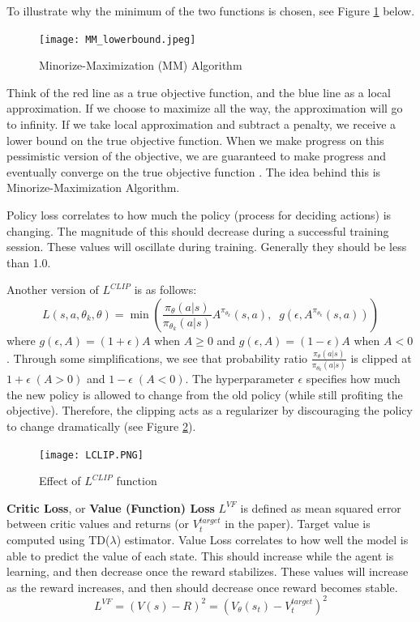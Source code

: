 \documentclass[lang=en,mode=normal,device=normal,color=blue,12pt]{elegantnote}
\DeclareMathOperator*{\1}{\mathbbm{1}}
\begin{document}
To illustrate why the minimum of the two functions is chosen, see Figure \ref{fig:mm_algo} below.
\begin{figure}[!ht]
  \centering
  \texttt{[image: MM\_lowerbound.jpeg]}
  \caption{Minorize-Maximization (MM) Algorithm}
  \label{fig:mm_algo}
\end{figure}
Think of the red line as a true objective function, and the blue line as a local approximation.
If we choose to maximize all the way, the approximation will go to infinity.
If we take local approximation and subtract a penalty, we receive a lower bound on the true objective function.
When we make progress on this pessimistic version of the objective, we are guaranteed to make progress and eventually converge on the true objective function \cite{ppocs294}. The idea behind this is Minorize-Maximization Algorithm.

Policy loss correlates to how much the policy (process for deciding actions) is changing.
The magnitude of this should decrease during a successful training session.
These values will oscillate during training. Generally they should be less than 1.0.


Another version of $L^{CLIP}$ is as follows:
$$ L(s,a,\theta_k,\theta) = \min\left(
\frac{\pi_{\theta}(a|s)}{\pi_{\theta_k}(a|s)}  A^{\pi_{\theta_k}}(s,a), \;\;
g(\epsilon, A^{\pi_{\theta_k}}(s,a))
\right) $$
where $g(\epsilon,A) = (1+\epsilon)A$ when $A \geq 0$ and $g(\epsilon,A) = (1-\epsilon)A$ when $A < 0$. Through some simplifications, we see that probability ratio $\frac{\pi_{\theta}(a|s)}{\pi_{\theta_k}(a|s)}$ is clipped at $1+\epsilon\;(A>0)$ and $1-\epsilon\;(A<0)$. The hyperparameter $\epsilon$ specifies how much the new policy is allowed to change from the old policy (while still profiting the objective). Therefore, the clipping acts as a regularizer by discouraging the policy to change dramatically (see Figure \ref{fig:lclip}).

\begin{figure}[!ht]
  \centering
  \texttt{[image: LCLIP.PNG]}
  \caption{Effect of $L^{CLIP}$ function \cite{ppolclip}}
  \label{fig:lclip}
\end{figure}

\textbf{Critic Loss}, or \textbf{Value (Function) Loss} $L^{VF}$ is defined as mean squared error between critic values and returns (or $V_t^{target}$ in the paper).
Target value is computed using TD($\lambda$) estimator.
Value Loss correlates to how well the model is able to predict the value of each state.
This should increase while the agent is learning, and then decrease once the reward stabilizes.
These values will increase as the reward increases, and then should decrease once reward becomes stable.
\[
L^{VF} = (V(s) - R)^2 = (V_\theta(s_t) - V_t^{target})^2
\]
\end{document}
